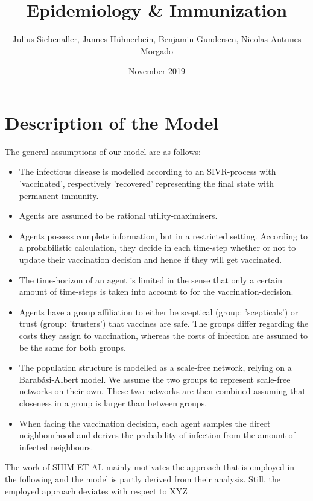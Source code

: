 \documentclass[11pt]{article}
\title{Epidemiology \& Immunization}
\author{Julius Siebenaller, Jannes Hühnerbein, Benjamin Gundersen, Nicolas Antunes Morgado}
\date{November 2019}
\begin{document}
\section{Description of the Model}


The general assumptions of our model are as follows:
\begin{itemize}
\item{The infectious disease is modelled according to an SIVR-process with 'vaccinated', respectively 'recovered' representing the final state with permanent immunity.}
\item{Agents are assumed to be rational utility-maximisers.}
\item{Agents possess complete information, but in a restricted setting. According to a probabilistic calculation, they decide in each time-step whether or not to update their vaccination decision and hence if they will get vaccinated.}
\item{The time-horizon of an agent is limited in the sense that only a certain amount of time-steps is taken into account to for the vaccination-decision.}
\item{Agents have a group affiliation to either be sceptical (group: 'scepticals') or trust (group: 'trusters') that vaccines are safe. The groups differ regarding the costs they assign to vaccination, whereas the costs of infection are assumed to be the same for both groups.}
\item{The population structure is modelled as a scale-free network, relying on a Barabási-Albert model. We assume the two groups to represent scale-free networks on their own. These two networks are then combined assuming that closeness in a group is larger than between groups.}
\item{When facing the vaccination decision, each agent samples the direct neighbourhood and derives the probability of infection from the amount of infected neighbours.}
\end{itemize}
The work of SHIM ET AL mainly motivates the approach that is employed in the following and the model is partly derived from their analysis. Still, the employed approach deviates with respect to XYZ
\end{document}
